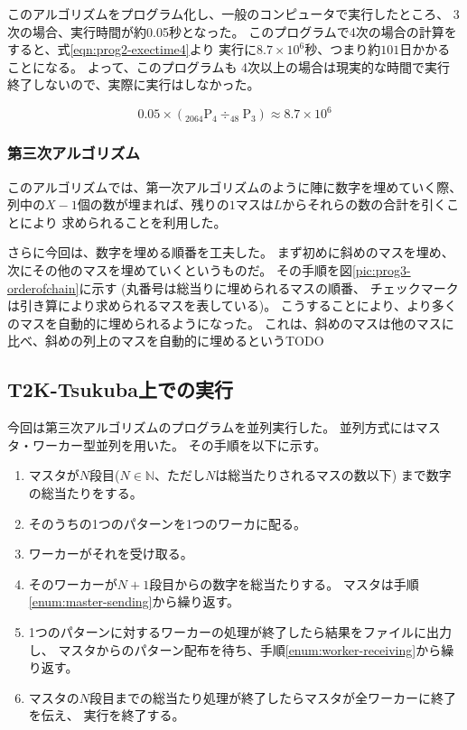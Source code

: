 このアルゴリズムをプログラム化し、一般のコンピュータで実行したところ、
3次の場合、実行時間が約0.05秒となった。
このプログラムで4次の場合の計算をすると、式\ref{eqn:prog2-exectime4}より
実行に$8.7 \times 10^6$秒、つまり約$101$日かかることになる。
よって、このプログラムも
4次以上の場合は現実的な時間で実行終了しないので、実際に実行はしなかった。

\begin{equation} \label{eqn:prog2-exectime4}
0.05 \times (_{2064} \mathrm{P} _4 \div _{48} \mathrm{P} _3) \approx 8.7 \times 10^6
\end{equation}

\subsubsection{第三次アルゴリズム}
このアルゴリズムでは、第一次アルゴリズムのように陣に数字を埋めていく際、
列中の$X-1$個の数が埋まれば、残りの$1$マスは$L$からそれらの数の合計を引くことにより
求められることを利用した。

さらに今回は、数字を埋める順番を工夫した。
まず初めに斜めのマスを埋め、次にその他のマスを埋めていくというものだ。
その手順を図\ref{pic:prog3-orderofchain}に示す
(丸番号は総当りに埋められるマスの順番、
チェックマークは引き算により求められるマスを表している)。
こうすることにより、より多くのマスを自動的に埋められるようになった。
これは、斜めのマスは他のマスに比べ、斜めの列上のマスを自動的に埋めるというTODO


\subsection{T2K-Tsukuba上での実行}
今回は第三次アルゴリズムのプログラムを並列実行した。
並列方式にはマスタ・ワーカー型並列を用いた。
その手順を以下に示す。
\begin{enumerate}
\item マスタが$N$段目($N \in \mathbb{N}$、ただし$N$は総当たりされるマスの数以下)
まで数字の総当たりをする。
\item そのうちの1つのパターンを1つのワーカに配る。 \label{enum:master-sending}
\item ワーカーがそれを受け取る。 \label{enum:worker-receiving}
\item そのワーカーが$N+1$段目からの数字を総当たりする。
マスタは手順\ref{enum:master-sending}から繰り返す。
\item 1つのパターンに対するワーカーの処理が終了したら結果をファイルに出力し、
マスタからのパターン配布を待ち、手順\ref{enum:worker-receiving}から繰り返す。
\item マスタの$N$段目までの総当たり処理が終了したらマスタが全ワーカーに終了を伝え、
実行を終了する。
\end{enumerate}
